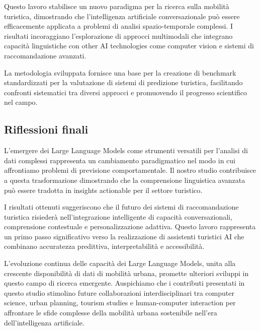 Questo lavoro stabilisce un nuovo paradigma per la ricerca sulla mobilità turistica, dimostrando che l'intelligenza artificiale conversazionale può essere efficacemente applicata a problemi di analisi spazio-temporale complessi. I risultati incoraggiano l'esplorazione di approcci multimodali che integrano capacità linguistiche con other AI technologies come computer vision e sistemi di raccomandazione avanzati.

La metodologia sviluppata fornisce una base per la creazione di benchmark standardizzati per la valutazione di sistemi di predizione turistica, facilitando confronti sistematici tra diversi approcci e promuovendo il progresso scientifico nel campo.

\subsection{Riflessioni finali}

L'emergere dei Large Language Models come strumenti versatili per l'analisi di dati complessi rappresenta un cambiamento paradigmatico nel modo in cui affrontiamo problemi di previsione comportamentale. Il nostro studio contribuisce a questa trasformazione dimostrando che la comprensione linguistica avanzata può essere tradotta in insights actionable per il settore turistico.

I risultati ottenuti suggeriscono che il futuro dei sistemi di raccomandazione turistica risiederà nell'integrazione intelligente di capacità conversazionali, comprensione contestuale e personalizzazione adattiva. Questo lavoro rappresenta un primo passo significativo verso la realizzazione di assistenti turistici AI che combinano accuratezza predittiva, interpretabilità e accessibilità.

L'evoluzione continua delle capacità dei Large Language Models, unita alla crescente disponibilità di dati di mobilità urbana, promette ulteriori sviluppi in questo campo di ricerca emergente. Auspichiamo che i contributi presentati in questo studio stimolino future collaborazioni interdisciplinari tra computer science, urban planning, tourism studies e human-computer interaction per affrontare le sfide complesse della mobilità urbana sostenibile nell'era dell'intelligenza artificiale.
